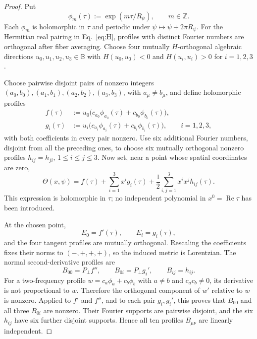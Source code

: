 \documentclass[11pt,a4paper]{article}
\theoremstyle{remark}
\newcommand{\B}{\mathbb B}
\begin{document}
\begin{proof}
Put
\begin{equation}
  \phi_m(\tau):=\exp(m\tau/R_\psi),\qquad m\in\mathbb Z.
\end{equation}
Each $\phi_m$ is holomorphic in $\tau$ and periodic under
$\psi\mapsto\psi+2\pi R_\psi$.  For the Hermitian real pairing in
Eq.~\eqref{eq:H}, profiles with distinct Fourier numbers are orthogonal after
fiber averaging.  Choose four mutually $H$-orthogonal algebraic directions
$u_0,u_1,u_2,u_3\in\B$ with $H(u_0,u_0)<0$ and
$H(u_i,u_i)>0$ for $i=1,2,3$.

Choose pairwise disjoint pairs of nonzero integers
$(a_0,b_0),(a_1,b_1),(a_2,b_2),(a_3,b_3)$, with $a_\mu\ne b_\mu$, and define
holomorphic profiles
\begin{align}
 f(\tau)&:=u_0\bigl(c_{a_0}\phi_{a_0}(\tau)
                   +c_{b_0}\phi_{b_0}(\tau)\bigr),\\
 g_i(\tau)&:=u_i\bigl(c_{a_i}\phi_{a_i}(\tau)
                   +c_{b_i}\phi_{b_i}(\tau)\bigr),\qquad i=1,2,3,
\end{align}
with both coefficients in every pair nonzero.  Use six additional Fourier
numbers, disjoint from all the preceding ones, to choose six mutually
orthogonal nonzero profiles $h_{ij}=h_{ji}$, $1\le i\le j\le3$.
Now set, near a point whose spatial coordinates are zero,
\begin{equation}
 \Theta(x,\psi)
 =f(\tau)+\sum_{i=1}^3x^i g_i(\tau)
  +\frac12\sum_{i,j=1}^3x^ix^j h_{ij}(\tau).
 \label{eq:holomorphicjet}
\end{equation}
This expression is holomorphic in $\tau$; no independent polynomial in
$x^0=\operatorname{Re}\tau$ has been introduced.

At the chosen point,
\begin{equation}
 E_0=f'(\tau),\qquad E_i=g_i(\tau),
\end{equation}
and the four tangent profiles are mutually orthogonal.  Rescaling the
coefficients fixes their norms to $(-,+,+,+)$, so the induced metric is
Lorentzian.  The normal second-derivative profiles are
\begin{equation}
 B_{00}=P_\perp f'',\qquad
 B_{0i}=P_\perp g_i',\qquad
 B_{ij}=h_{ij}.
\end{equation}
For a two-frequency profile $w=c_a\phi_a+c_b\phi_b$ with $a\ne b$ and
$c_ac_b\ne0$, its derivative is not proportional to $w$.  Therefore the
orthogonal component of $w'$ relative to $w$ is nonzero.  Applied to $f'$ and
$f''$, and to each pair $g_i,g_i'$, this proves that $B_{00}$ and all three
$B_{0i}$ are nonzero.  Their Fourier supports are pairwise disjoint, and the
six $h_{ij}$ have six further disjoint supports.  Hence all ten profiles
$B_{\mu\nu}$ are linearly independent.
\end{proof}
\end{document}
